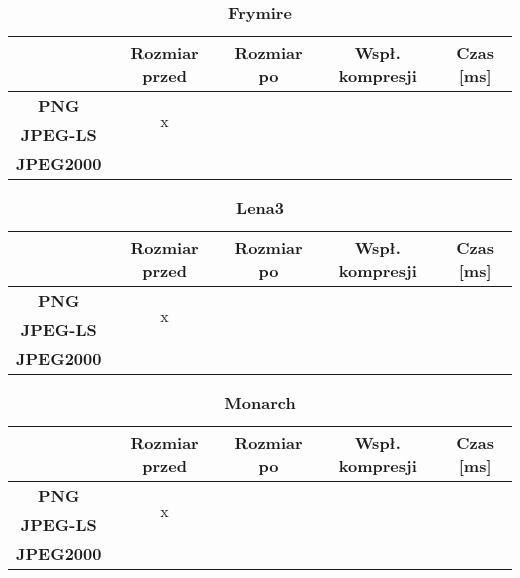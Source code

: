 \begin{table}[!h]
	\centering
	\caption{\textbf{Frymire}}
	\label{my-label}
	\begin{tabular}{|c|c|c|c|c|}                                             
		\hline
		& \textbf{Rozmiar przed} & \textbf{Rozmiar po} & \textbf{Wspł. kompresji} & \textbf{Czas {[}ms{]}} \\ \hline 
		\textbf{PNG}      &          \multicolumn{1}{c|}{\multirow{2}{*}{x}}             &                     &                          &                             \\\cline{3-5}
		\textbf{JPEG-LS}  &                        &                     &                          &                          \\\cline{3-5}
		\textbf{JPEG2000} &                        &                     &                          &                      \\ \hline
	\end{tabular}
\end{table}

\begin{table}[!h]
	\centering
	\caption{\textbf{Lena3}}
	\label{my-label}
	\begin{tabular}{|c|c|c|c|c|}                                             
		\hline
		& \textbf{Rozmiar przed} & \textbf{Rozmiar po} & \textbf{Wspł. kompresji} & \textbf{Czas {[}ms{]}} \\ \hline 
		\textbf{PNG}      &          \multicolumn{1}{c|}{\multirow{2}{*}{x}}             &                     &                          &                             \\\cline{3-5}
		\textbf{JPEG-LS}  &                        &                     &                          &                          \\\cline{3-5}
		\textbf{JPEG2000} &                        &                     &                          &                      \\ \hline
	\end{tabular}
\end{table}

\begin{table}[!h]
	\centering
	\caption{\textbf{Monarch}}
	\label{my-label}
	\begin{tabular}{|c|c|c|c|c|}                                             
		\hline
		& \textbf{Rozmiar przed} & \textbf{Rozmiar po} & \textbf{Wspł. kompresji} & \textbf{Czas {[}ms{]}} \\ \hline 
		\textbf{PNG}      &          \multicolumn{1}{c|}{\multirow{2}{*}{x}}             &                     &                          &                             \\\cline{3-5}
		\textbf{JPEG-LS}  &                        &                     &                          &                          \\\cline{3-5}
		\textbf{JPEG2000} &                        &                     &                          &                      \\ \hline
	\end{tabular}
\end{table}

